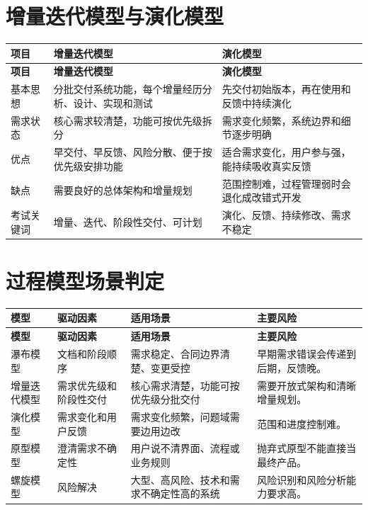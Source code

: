 \documentclass[UTF8,zihao=-4]{ctexart}
\begin{document}
\section{增量迭代模型与演化模型}

{
\footnotesize
\begin{longtable}{|>{\raggedright\arraybackslash}p{}|>{\raggedright\arraybackslash}p{}|>{\raggedright\arraybackslash}p{}|}
\hline
\textbf{项目} & \textbf{增量迭代模型} & \textbf{演化模型} \\
\hline
\endfirsthead
\hline
\textbf{项目} & \textbf{增量迭代模型} & \textbf{演化模型} \\
\hline
\endhead
基本思想 & 分批交付系统功能，每个增量经历分析、设计、实现和测试 & 先交付初始版本，再在使用和反馈中持续演化 \\
\hline
需求状态 & 核心需求较清楚，功能可按优先级拆分 & 需求变化频繁，系统边界和细节逐步明确 \\
\hline
优点 & 早交付、早反馈、风险分散、便于按优先级安排功能 & 适合需求变化，用户参与强，能持续吸收真实反馈 \\
\hline
缺点 & 需要良好的总体架构和增量规划 & 范围控制难，过程管理弱时会退化成改错式开发 \\
\hline
考试关键词 & 增量、迭代、阶段性交付、可计划 & 演化、反馈、持续修改、需求不稳定 \\
\hline
\end{longtable}
}


\section{过程模型场景判定}

{
\footnotesize
\begin{longtable}{|>{\raggedright\arraybackslash}p{}|>{\raggedright\arraybackslash}p{}|>{\raggedright\arraybackslash}p{}|>{\raggedright\arraybackslash}p{}|}
\hline
\textbf{模型} & \textbf{驱动因素} & \textbf{适用场景} & \textbf{主要风险} \\
\hline
\endfirsthead
\hline
\textbf{模型} & \textbf{驱动因素} & \textbf{适用场景} & \textbf{主要风险} \\
\hline
\endhead
瀑布模型 & 文档和阶段顺序 & 需求稳定、合同边界清楚、变更受控 & 早期需求错误会传递到后期，反馈晚。 \\
\hline
增量迭代模型 & 需求优先级和阶段性交付 & 核心需求清楚，功能可按优先级分批交付 & 需要开放式架构和清晰增量规划。 \\
\hline
演化模型 & 需求变化和用户反馈 & 需求变化频繁，问题域需要边用边改 & 范围和进度控制难。 \\
\hline
原型模型 & 澄清需求不确定性 & 用户说不清界面、流程或业务规则 & 抛弃式原型不能直接当最终产品。 \\
\hline
螺旋模型 & 风险解决 & 大型、高风险、技术和需求不确定性高的系统 & 风险识别和风险分析能力要求高。 \\
\hline
\end{longtable}
}
\end{document}
